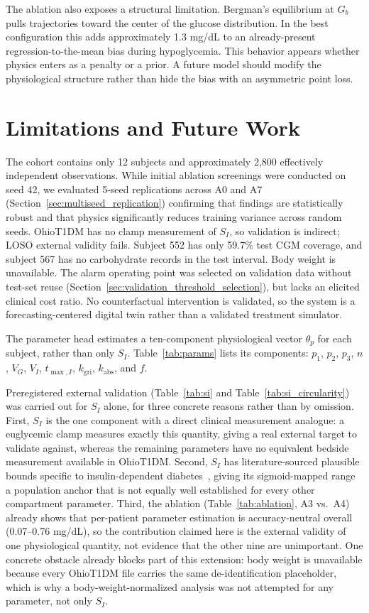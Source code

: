 \documentclass[journal]{IEEEtran}
\begin{document}
The ablation also exposes a structural limitation. Bergman's equilibrium at $G_b$ pulls trajectories toward the center of the glucose distribution. In the best configuration this adds approximately 1.3 mg/dL to an already-present regression-to-the-mean bias during hypoglycemia. This behavior appears whether physics enters as a penalty or a prior. A future model should modify the physiological structure rather than hide the bias with an asymmetric point loss.

\section{Limitations and Future Work}

The cohort contains only 12 subjects and approximately 2,800 effectively independent observations. While initial ablation screenings were conducted on seed 42, we evaluated 5-seed replications across A0 and A7 (Section~\ref{sec:multiseed_replication}) confirming that findings are statistically robust and that physics significantly reduces training variance across random seeds. OhioT1DM has no clamp measurement of $S_I$, so validation is indirect; LOSO external validity fails. Subject 552 has only 59.7\% test CGM coverage, and subject 567 has no carbohydrate records in the test interval. Body weight is unavailable. The alarm operating point was selected on validation data without test-set reuse (Section~\ref{sec:validation_threshold_selection}), but lacks an elicited clinical cost ratio. No counterfactual intervention is validated, so the system is a forecasting-centered digital twin rather than a validated treatment simulator.

The parameter head estimates a ten-component physiological vector $\theta_p$ for each subject, rather than only $S_I$. Table~\ref{tab:params} lists its components: $p_1$, $p_2$, $p_3$, $n$, $V_G$, $V_I$, $t_{\max,I}$, $k_{\text{gri}}$, $k_{\text{abs}}$, and $f$.

Preregistered external validation (Table~\ref{tab:si} and Table~\ref{tab:si_circularity}) was carried out for $S_I$ alone, for three concrete reasons rather than by omission. First, $S_I$ is the one component with a direct clinical measurement analogue: a euglycemic clamp measures exactly this quantity, giving a real external target to validate against, whereas the remaining parameters have no equivalent bedside measurement available in OhioT1DM\@. Second, $S_I$ has literature-sourced plausible bounds specific to insulin-dependent diabetes~\cite{ref33}, giving its sigmoid-mapped range a population anchor that is not equally well established for every other compartment parameter. Third, the ablation (Table~\ref{tab:ablation}, A3 vs.\ A4) already shows that per-patient parameter estimation is accuracy-neutral overall (0.07--0.76 mg/dL), so the contribution claimed here is the external validity of one physiological quantity, not evidence that the other nine are unimportant. One concrete obstacle already blocks part of this extension: body weight is unavailable because every OhioT1DM file carries the same de-identification placeholder, which is why a body-weight-normalized analysis was not attempted for any parameter, not only $S_I$.
\end{document}
